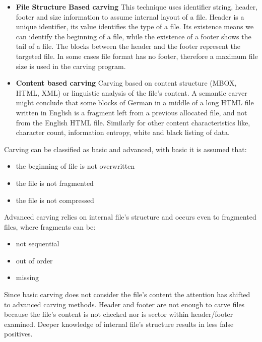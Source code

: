 \documentclass{acm_proc_article-sp}
\begin{document}
\begin{itemize}
\item \textbf{File Structure Based carving}
This technique uses identifier string, header, footer and size information to assume internal layout of a file. Header is a unique identifier, its value identifies the type of a file. Its existence means we can identify the beginning of a file, while the existence of a footer shows the tail of a file.
The blocks between the header and the footer represent the targeted file. In some cases file format has no footer, therefore a maximum file size is used in the carving program.
\item \textbf{Content based carving}
Carving based on content structure (MBOX, HTML, XML) or linguistic analysis of the file's content. A semantic carver might conclude that some blocks of German in a middle of a long HTML file written in English is a fragment left from a previous allocated file, and not from the English HTML file. Similarly for other content characteristics like, character count, information entropy, white and black listing of data.
\end{itemize}
Carving can be classified as basic and advanced, with basic it is assumed that:
\begin{itemize} 
\item the beginning of file is not overwritten
\item the file is not fragmented
\item the file is not compressed
\end{itemize}
Advanced carving relies on internal file's structure and occurs even to fragmented files, where fragments can be:
\begin{itemize} 
\item not sequential
\item out of order
\item missing
\end{itemize}
Since basic carving does not consider the file's content the  attention has shifted to  advanced  carving methods. Header and footer are not enough to carve files because the file's content is not checked nor is sector within header/footer examined. Deeper knowledge of internal file's structure results in less false positives. 
\end{document}
